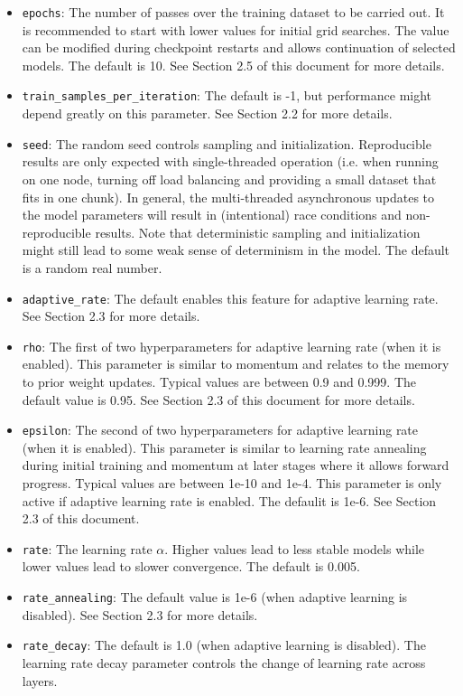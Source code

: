\documentclass[12pt]{article}
\begin{document}
\begin{itemize}
\item \texttt{epochs}: The number of passes over the training dataset to be carried out. It is recommended to start with lower values for initial grid searches. The value can be modified during checkpoint restarts and allows continuation of selected models. The default is 10. See Section 2.5 of this document for more details. 
\item \texttt{train\_samples\_per\_iteration}: The default is -1, but performance might depend greatly on this parameter. See Section 2.2 for more details. 
\item \texttt{seed}: The random seed controls sampling and initialization. Reproducible results are only expected with single-threaded operation (i.e. when running on one node, turning off load balancing and providing a small dataset that fits in one chunk).  In general, the multi-threaded asynchronous updates to the model parameters will result in (intentional) race conditions and non-reproducible results. Note that deterministic sampling and initialization might still lead to some weak sense of determinism in the model. The default is a random real number.
\item \texttt{adaptive\_rate}: The default enables this feature for adaptive learning rate. See Section 2.3  for more details. 
\item \texttt{rho}: The first of two hyperparameters for adaptive learning rate (when it is enabled). This parameter is similar to momentum and relates to the memory to prior weight updates. Typical values are between 0.9 and 0.999. The default value is 0.95. See Section 2.3 of this document for more details. 
\item \texttt{epsilon}: The second of two hyperparameters for adaptive learning rate (when it is enabled). This parameter is similar to learning rate annealing during initial training and momentum at later stages where it allows forward progress. Typical values are between 1e-10 and 1e-4. This parameter is only active if adaptive learning rate is enabled. The defaulit is 1e-6. See Section 2.3 of this document. 
\item \texttt{rate}: The learning rate $\alpha$. Higher values lead to less stable models  while lower values  lead to slower convergence. The default is 0.005.
\item \texttt{rate\_annealing}: The default value is 1e-6 (when adaptive learning is disabled). See Section 2.3 for more details.
\item \texttt{rate\_decay}: The default is 1.0 (when adaptive learning is disabled). The learning rate decay parameter controls the change of learning rate across layers. 

\end{itemize}
\end{document}
